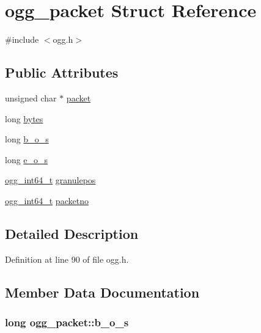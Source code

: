 \hypertarget{structogg__packet}{}\section{ogg\+\_\+packet Struct Reference}
\label{structogg__packet}


{\ttfamily \#include $<$ogg.\+h$>$}

\subsection*{Public Attributes}
\begin{DoxyCompactItemize}
\item 
unsigned char $\ast$ \hyperlink{structogg__packet_a57e7096985ec8766dce415e248767c32}{packet}
\item 
long \hyperlink{structogg__packet_a4438269ce6025d8817865ae66d5881f1}{bytes}
\item 
long \hyperlink{structogg__packet_adbf12677237d6f5333017de9b59b4ea7}{b\+\_\+o\+\_\+s}
\item 
long \hyperlink{structogg__packet_aa367e7c5425c5f65cbd126b82dfc72e8}{e\+\_\+o\+\_\+s}
\item 
\hyperlink{config__types_8h_a292432ede703993aa88db876e11b2306}{ogg\+\_\+int64\+\_\+t} \hyperlink{structogg__packet_a838d9a000e08bae982409bc2734fc566}{granulepos}
\item 
\hyperlink{config__types_8h_a292432ede703993aa88db876e11b2306}{ogg\+\_\+int64\+\_\+t} \hyperlink{structogg__packet_a60e257b3a8f843135474457197c65a45}{packetno}
\end{DoxyCompactItemize}


\subsection{Detailed Description}


Definition at line 90 of file ogg.\+h.



\subsection{Member Data Documentation}
\subsubsection[{\texorpdfstring{b\+\_\+o\+\_\+s}{b_o_s}}]{\setlength{\rightskip}{0pt plus 5cm}long ogg\+\_\+packet\+::b\+\_\+o\+\_\+s}\hypertarget{structogg__packet_adbf12677237d6f5333017de9b59b4ea7}{}\label{structogg__packet_adbf12677237d6f5333017de9b59b4ea7}


